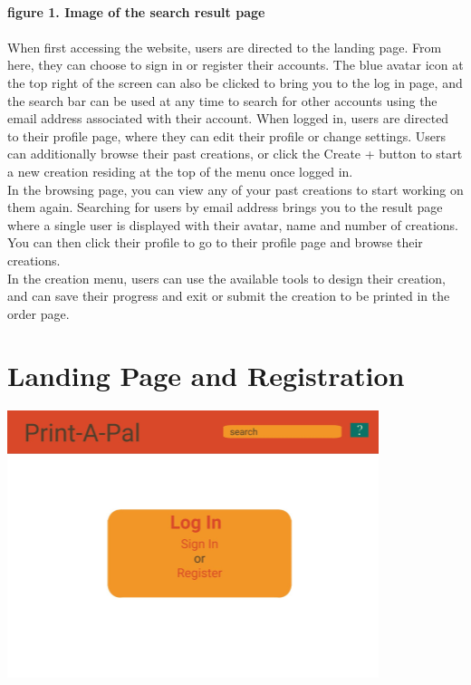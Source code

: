 \documentclass{report}
\begin{document}
\paragraph{figure 1. Image of the search result page}
\paragraph{}
When first accessing the website, users are directed to the landing page.  From here, they can choose to sign in or register their accounts.  The blue avatar icon at the top right of the screen can also be clicked to bring you to the log in page, and the search bar can be used at any time to search for other accounts using the email address associated with their account.   When logged in, users are directed to their profile page, where they can edit their profile or change settings.  Users can additionally browse their past creations, or click the Create + button to start a new creation residing at the top of the menu once logged in.\\
 
\noindent In the browsing page, you can view any of your past creations to start working on them again.  Searching for users by email address brings you to the result page where a single user is displayed with their avatar, name and number of creations.  You can then click their profile to go to their profile page and browse their creations. \\
 
\noindent In the creation menu, users can use the available tools to design their creation, and can save their progress and exit or submit the creation to be printed in the order page. 
\section{Landing Page and Registration}

\begin{center}
\includegraphics[width=\textwidth/2]{login.png}
\end{center}
\end{document}

